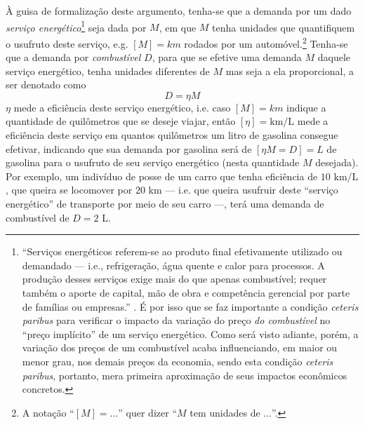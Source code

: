 À guisa de formalização deste argumento, tenha-se que a demanda por um dado \textit{serviço energético}\footnote{``Serviços energéticos referem-se ao produto final efetivamente utilizado ou demandado --- i.e., refrigeração, água quente e calor para processos. A produção desses serviços exige mais do que apenas combustível; requer também o aporte de capital, mão de obra e competência gerencial por parte de famílias ou empresas.'' \parencite[p. 389, n. 1]{Greening2000}. É por isso que se faz importante a condição \textit{ceteris paribus} para verificar o impacto da variação do preço \textit{do combustível} no ``preço implícito'' de um serviço energético. Como será visto adiante, porém, a variação dos preços de um combustível acaba influenciando, em maior ou menor grau, nos demais preços da economia, sendo esta condição \textit{ceteris paribus}, portanto, mera primeira aproximação de seus impactos econômicos concretos.} seja dada por $M$, em que $M$ tenha unidades que quantifiquem o usufruto deste serviço, e.g. $[M]=km$ rodados por um automóvel.\footnote{A notação ``$[M]=\dots$'' quer dizer ``$M$ tem unidades de $\dots$''.} Tenha-se que a demanda por \textit{combustível} $D$, para que se efetive uma demanda $M$ daquele serviço energético, tenha unidades diferentes de $M$ mas seja a ela proporcional, a ser denotado como
$$
D = \eta M
$$
$\eta$ mede a eficiência deste serviço energético, i.e. caso $[M]=km$ indique a quantidade de quilômetros que se deseje viajar, então $[\eta]=\text{km/L}$ mede a eficiência deste serviço em quantos quilômetros um litro de gasolina consegue efetivar, indicando que sua demanda por gasolina será de $[\eta M = D]=L$ de gasolina para o usufruto de seu serviço energético (nesta quantidade $M$ desejada). Por exemplo, um indivíduo de posse de um carro que tenha eficiência de $10\text{ km/L}$, que queira se locomover por $20$ km --- i.e. que queira usufruir deste ``serviço energético'' de transporte por meio de seu carro ---, terá uma demanda de combustível de $D=2\text{ L}$.

